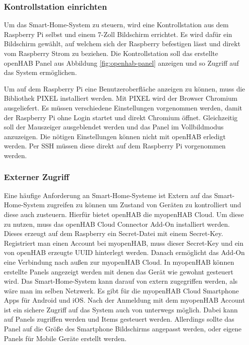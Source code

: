 		\subsubsection{Kontrollstation einrichten}
		Um das Smart-Home-System zu steuern, wird eine Kontrollstation aus dem Raspberry Pi selbst und einem 7-Zoll Bildschirm errichtet. Es wird dafür ein Bildschirm gewählt, auf welchem sich der Raspberry befestigen lässt und direkt vom Raspberry Strom zu beziehen.
		Die Kontrollstation soll das erstellte openHAB Panel aus Abbildung \ref{fig:openhab-panel} anzeigen und so Zugriff auf das System ermöglichen.

		Um auf dem Raspberry Pi eine Benutzeroberfläche anzeigen zu können, muss die Bibliothek PIXEL installiert werden. Mit PIXEL wird der Browser Chromium ausgeliefert. Es müssen verschiedene Einstellungen vorgenommen werden, damit der Raspberry Pi ohne Login startet und direkt Chromium öffnet. Gleichzeitig soll der Mauszeiger ausgeblendet werden und das Panel im Vollbildmodus anzuzeigen. Die nötigen Einstellungen können nicht mit openHAB erledigt werden. Per SSH müssen diese direkt auf dem Raspberry Pi vorgenommen werden.

		\subsubsection{Externer Zugriff}
		Eine häufige Anforderung an Smart-Home-Systeme ist Extern auf das Smart-Home-System zugreifen zu können um Zustand von Geräten zu kontrolliert und diese auch zusteuern. Hierfür bietet openHAB die myopenHAB Cloud. Um diese zu nutzen, muss das openHAB Cloud Connector Add-On installiert werden. Dieses erzeugt auf dem Raspberry ein Secret-Datei mit einem Secret-Key. Registriert man einen Account bei myopenHAB, muss dieser Secret-Key und ein von openHAB erzeugte UUID hinterlegt werden. Danach ermöglicht das Add-On eine Verbindung nach außen zur myopenHAB Cloud.
		In myopenHAB können erstellte Panels angezeigt werden mit denen das Gerät wie gewohnt gesteuert wird. Das Smart-Home-System kann darauf von extern zugegriffen werden, als wäre man im selben Netzwerk.
		Es gibt für die myopenHAB Cloud Smartphone Apps für Android und iOS. Nach der Anmeldung mit dem myopenHAB Account ist ein sichere Zugriff auf das System auch von unterwegs möglich. Dabei kann auf Panels zugriffen werden und Items gesteuert werden. Allerdings sollte das Panel auf die Größe des Smartphone Bildschirms angepasst werden, oder eigene Panels für Mobile Geräte erstellt werden.
		
